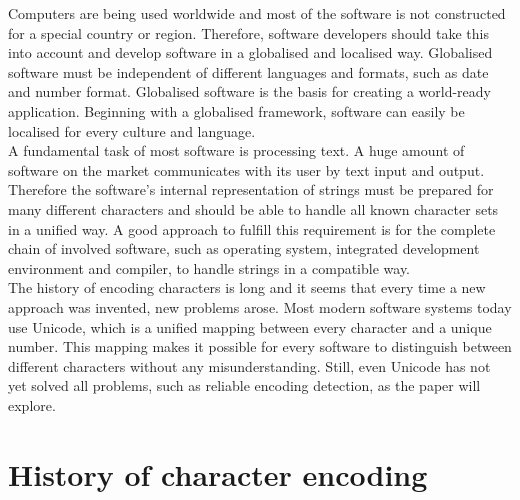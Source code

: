 \documentclass[a4paper, 12pt]{scrartcl} %
\begin{document}
Computers are being used worldwide and most of the software is not constructed
for a special country or region. Therefore, software developers should take
this into account and develop software in a globalised and localised way.
Globalised software must be independent of different languages and formats,
such as date and number format. Globalised software is the basis for creating a
world-ready application. Beginning with a globalised framework, software can
easily be localised for every culture and language. \\
A fundamental task of most software is processing text. A huge amount of
software on the market communicates with its user by text input and output.
Therefore the software's internal representation of strings must be prepared
for many different characters and should be able to handle all known character
sets in a unified way. A good approach to fulfill this requirement is for the
complete chain of involved software, such as operating system, integrated
development environment and compiler, to handle strings in a compatible way. \\
The history of encoding characters is long and it seems that every time a new
approach was invented, new problems arose. Most modern software systems today
use Unicode, which is a unified mapping between every character and a unique
number. This mapping makes it possible for every software to distinguish
between different characters without any misunderstanding. Still, even Unicode
has not yet solved all problems, such as reliable encoding detection, as the
paper will explore.

\section{History of character encoding}
\end{document}
